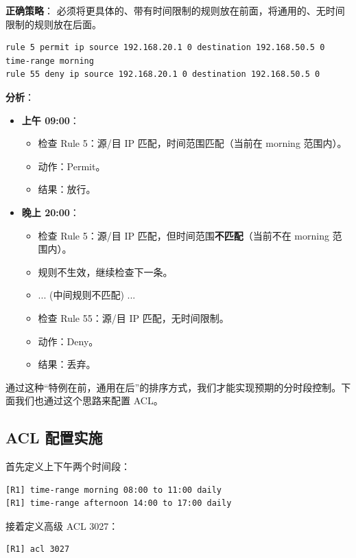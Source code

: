 \documentclass[a4paper]{article}
\begin{document}
\textbf{正确策略}：
必须将更具体的、带有时间限制的规则放在前面，将通用的、无时间限制的规则放在后面。
\begin{lstlisting}[language=HuaweiConfig, caption={ACL 正确策略示例}]
rule 5 permit ip source 192.168.20.1 0 destination 192.168.50.5 0 time-range morning
rule 55 deny ip source 192.168.20.1 0 destination 192.168.50.5 0
\end{lstlisting}
\textbf{分析}：
\begin{itemize}
    \item \textbf{上午 09:00}：
    \begin{itemize}
        \item 检查 Rule 5：源/目 IP 匹配，时间范围匹配（当前在 morning 范围内）。
        \item 动作：Permit。
        \item 结果：放行。
    \end{itemize}
    \item \textbf{晚上 20:00}：
    \begin{itemize}
        \item 检查 Rule 5：源/目 IP 匹配，但时间范围\textbf{不匹配}（当前不在 morning 范围内）。
        \item 规则不生效，继续检查下一条。
        \item ... (中间规则不匹配) ...
        \item 检查 Rule 55：源/目 IP 匹配，无时间限制。
        \item 动作：Deny。
        \item 结果：丢弃。
    \end{itemize}
\end{itemize}
通过这种“特例在前，通用在后”的排序方式，我们才能实现预期的分时段控制。下面我们也通过这个思路来配置 ACL。

\subsection{ACL 配置实施}

首先定义上下午两个时间段：

\begin{lstlisting}[language=HuaweiConfig, caption={定义时间段}]
[R1] time-range morning 08:00 to 11:00 daily
[R1] time-range afternoon 14:00 to 17:00 daily
\end{lstlisting}

接着定义高级 ACL 3027：

\begin{lstlisting}[language=HuaweiConfig, caption={ACL 3027 定义}]
[R1] acl 3027
\end{lstlisting}
\end{document}
